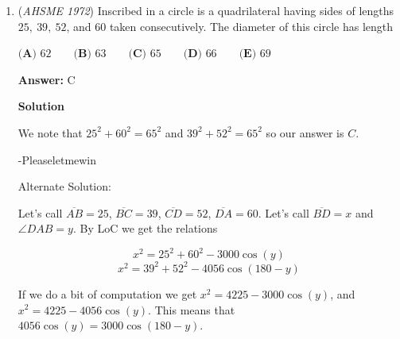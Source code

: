 \begin{enumerate}
 $\textbf{(A) }13\textstyle\frac{1}{2}\qquad \textbf{(B) }15\qquad \textbf{(C) }17\frac{1}{2}\qquad \textbf{(D) }20\qquad  \textbf{(E) }25$

 \textbf{Answer: }B



\textbf{Solution}

We can make three equations out of the information, and since the distances are the same, we can equate these equations.

 
 \[\frac{4t}{5}(x+\frac{1}{2})=xt=(t+\frac{5}{2})(x-\frac{1}{2})\]where $x$ is the man's rate and $t$ is the time it takes him.  

 Looking at the first two parts of the equations, 

 
 \[\frac{4t}{5}(x+\frac{1}{2})=xt\]

 we note that we can solve for $x$. Solving for $x$, we get $x=2.$

 Now we look at the last two parts of the equation:

 
 \[xt=(t+\frac{5}{2})(x-\frac{1}{2})\]

 we note that we can solve for $t$ and we get $t=\frac{15}{2}.$  We want the find the distance, which is $xt= \boxed{15}.$

 -edited for readability

 


	\item (\textit{AHSME 1972}) Inscribed in a circle is a quadrilateral having sides of lengths $25,~39,~52$, and $60$ taken consecutively. The diameter of this circle has length


 $\textbf{(A) }62\qquad \textbf{(B) }63\qquad \textbf{(C) }65\qquad \textbf{(D) }66\qquad  \textbf{(E) }69$

 \textbf{Answer: }C



\textbf{Solution}

We note that $25^2+60^2=65^2$ and $39^2+52^2=65^2$ so our answer is $\boxed{C}$.

 -Pleaseletmewin

 Alternate Solution:

 Let's call $\overline{AB}=25$, $\overline{BC}=39$, $\overline{CD}=52$, $\overline{DA}=60$. Let's call $\overline{BD}=x$ and $\angle{DAB}=y$. By LoC we get the relations

 
 \[x^2=25^2+60^2-3000\cos(y)\]
 \[x^2=39^2+52^2-4056\cos(180-y)\] 

 If we do a bit of computation we get $x^2=4225-3000\cos(y)$, and $x^2=4225-4056\cos(y)$. This means that $4056\cos(y)=3000\cos(180-y)$. 


\end{enumerate}
